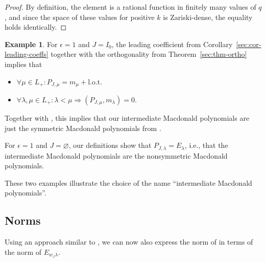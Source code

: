 \documentclass[pdftex]{sigma}
\theoremstyle{definition}
\newtheorem{Example}[Theorem]{Example}
\numberwithin{equation}{section}
\begin{document}
\begin{proof}
 By definition, the element  is a rational function in finitely many values of $q$, and since the space of these values for positive $k$ is Zariski-dense, the equality  holds identically.
\end{proof}

\begin{Example}
 For $\epsilon=1$ and $J=I_0$, the leading coefficient from
 Corollary~\ref{sec:cor-leading-coeffs} together with the orthogonality
 from Theorem~\ref{sec:thm-ortho} implies that
 \begin{itemize}\itemsep=0pt
 \item $\forall\mu\in L_+\colon P_{J,\mu} = m_\mu + \text{l.o.t.}$
 \item $\forall\lambda,\mu\in L_+\colon \lambda<\mu\Rightarrow (P_{J,\mu}, m_\lambda)=0$.
 \end{itemize}
 Together with \cite[Sections 5.1.35 and 5.3.1f]{macdonald}, this implies
 that our intermediate Macdonald polynomials are just the symmetric
 Macdonald polynomials from \cite[Section~5.3]{macdonald}.

 For $\epsilon=1$ and $J=\varnothing$, our definitions show that
 $P_{J,\lambda}=E_\lambda$, i.e., that the intermediate Macdonald polynomials
 are the nonsymmetric Macdonald polynomials.

 These two examples illustrate the choice of the name ``intermediate Macdonald polynomials''.
\end{Example}

\subsection{Norms}
Using an approach similar to \cite[Section~5.7.12]{macdonald}, we can now also
express the norm of  in terms of
the norm of $E_{w_J\lambda}$.
\end{document}
